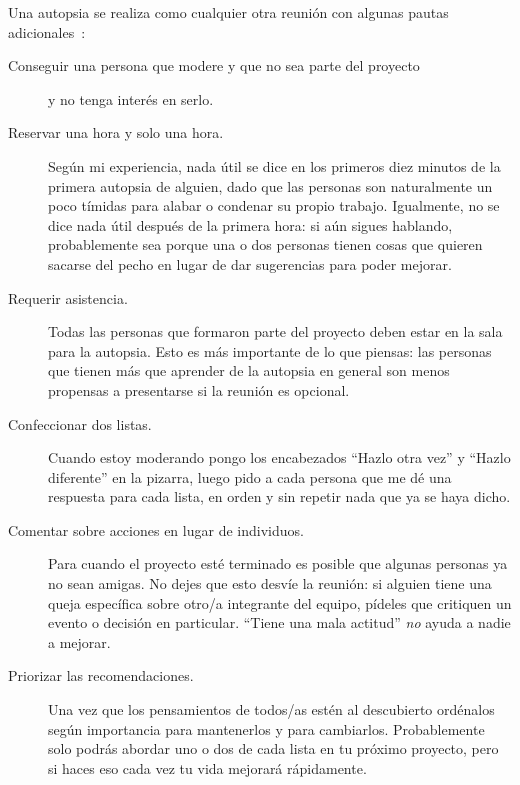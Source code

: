 Una autopsia se realiza como cualquier otra reunión
con algunas pautas adicionales~\cite{Derb2006}:

\begin{description}

\item[Conseguir una persona que modere y que no sea parte del proyecto]
  y no tenga interés en serlo.

\item[Reservar una hora y solo una hora.]
  Según mi experiencia,
  nada útil se dice en los primeros diez minutos de la primera autopsia de alguien,
  dado que las personas son naturalmente un poco tímidas para alabar o condenar su propio trabajo.
  Igualmente,
  no se dice nada útil después de la primera hora:
  si aún sigues hablando,
  probablemente sea porque una o dos personas
  tienen cosas que quieren sacarse del pecho
  en lugar de dar sugerencias para poder mejorar.

\item[Requerir asistencia.]
  Todas las personas que formaron parte del proyecto deben estar en la sala para la autopsia.
  Esto es más importante de lo que piensas:
  las personas que tienen más que aprender de la autopsia
  en general son menos propensas a presentarse si la reunión es opcional.

\item[Confeccionar dos listas.]
  Cuando estoy moderando
  pongo los encabezados ``Hazlo otra vez'' y ``Hazlo diferente'' en la pizarra,
  luego pido a cada persona que me dé una respuesta para cada lista, en orden y 
  sin repetir nada que ya se haya dicho.

\item[Comentar sobre acciones en lugar de individuos.]
  Para cuando el proyecto esté terminado
  es posible que algunas personas ya no sean amigas.
  No dejes que esto desvíe la reunión:
  si alguien tiene una queja específica sobre otro/a integrante del equipo,
  pídeles que critiquen un evento o decisión en particular.
  ``Tiene una mala actitud'' \emph{no} ayuda a nadie a mejorar.

\item[Priorizar las recomendaciones.]
  Una vez que los pensamientos de todos/as estén al descubierto
  ordénalos según importancia para mantenerlos
  y para cambiarlos.
  Probablemente solo podrás abordar uno o dos de cada lista en tu próximo proyecto,
  pero si haces eso cada vez
  tu vida mejorará rápidamente.

\end{description}
